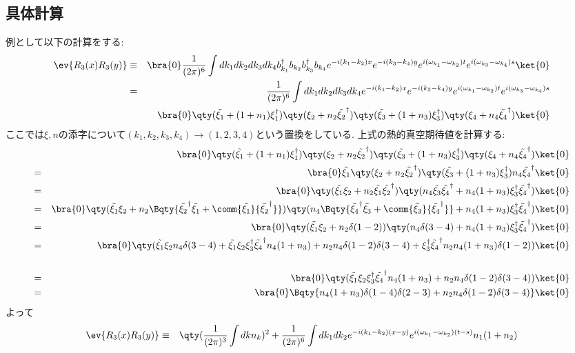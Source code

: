 \subsection{具体計算}
例として以下の計算をする:
\begin{eqnarray}
  \ev{R_3(x)R_3(y)} &\equiv& \bra{0}\frac{1}{(2\pi)^6}\int dk_1dk_2dk_3dk_4 b^\dagger_{k_1}b_{k_2}b^\dagger_{k_3}b_{k_4}e^{-i(k_1-k_2)x}e^{-i(k_3-k_4)y}e^{i(\omega_{k_1}-\omega_{k_2})t}e^{i(\omega_{k_3}-\omega_{k_4})s}\ket{0}\\
  \nonumber  &=& \frac{1}{(2\pi)^6}\int dk_1dk_2dk_3dk_4e^{-i(k_1-k_2)x}e^{-i(k_3-k_4)y}e^{i(\omega_{k_1}-\omega_{k_2})t}e^{i(\omega_{k_3}-\omega_{k_4})s}\\
  && \bra{0}\qty(\tilde{\xi_1} + (1+n_1)\xi_1^\dagger)\qty(\xi_2 + n_2\tilde{\xi_2}^\dagger)\qty(\tilde{\xi_3} + (1+n_3)\xi_3^\dagger)\qty(\xi_4 + n_4\tilde{\xi_4}^\dagger)\ket{0}
\end{eqnarray}
ここでは$\xi, n$の添字について$(k_1, k_2, k_3, k_4)\rightarrow(1, 2, 3, 4)$という置換をしている. 上式の熱的真空期待値を計算する:
\begin{eqnarray}
  &&\bra{0}\qty(\tilde{\xi_1} + (1+n_1)\xi_1^\dagger)\qty(\xi_2 + n_2\tilde{\xi_2}^\dagger)\qty(\tilde{\xi_3} + (1+n_3)\xi_3^\dagger)\qty(\xi_4 + n_4\tilde{\xi_4}^\dagger)\ket{0}\\
  =&&\bra{0}\tilde{\xi_1}\qty(\xi_2 + n_2\tilde{\xi_2}^\dagger)\qty(\tilde{\xi_3} + (1+n_3)\xi_3^\dagger)n_4\tilde{\xi_4}^\dagger\ket{0}\\
  =&&\bra{0}\qty(\tilde{\xi_1}\xi_2 + n_2\tilde{\xi_1}\tilde{\xi_2}^\dagger)\qty(n_4\tilde{\xi_3}\tilde{\xi_4}^\dagger + n_4(1+n_3)\xi_3^\dagger \tilde{\xi_4}^\dagger)\ket{0}\\
  =&&\bra{0}\qty(\tilde{\xi_1}\xi_2 + n_2\Bqty{\tilde{\xi_2}^\dagger\tilde{\xi_1} + \comm{\tilde{\xi_1}}{\tilde{\xi_2}^\dagger}})\qty(n_4\Bqty{\tilde{\xi_4}^\dagger\tilde{\xi_3} + \comm{\tilde{\xi_3}}{\tilde{\xi_4}^\dagger}} + n_4(1+n_3)\xi_3^\dagger \tilde{\xi_4}^\dagger)\ket{0}\\
  =&&\bra{0}\qty(\tilde{\xi_1}\xi_2 + n_2\delta(1-2))\qty(n_4\delta(3-4) + n_4(1+n_3)\xi_3^\dagger \tilde{\xi_4}^\dagger)\ket{0}\\
  \nonumber  = &&\bra{0}\qty(\tilde{\xi_1}\xi_2n_4\delta(3-4) + \tilde{\xi_1}\xi_2\xi_3^\dagger \tilde{\xi_4}^\dagger n_4(1+n_3) + n_2n_4\delta(1-2)\delta(3-4) + \xi_3^\dagger \tilde{\xi_4}^\dagger n_2n_4(1+n_3)\delta(1-2))\ket{0}\\
  \\
  = &&\bra{0}\qty(\tilde{\xi_1}\xi_2\xi_3^\dagger \tilde{\xi_4}^\dagger n_4(1+n_3) + n_2n_4\delta(1-2)\delta(3-4))\ket{0}\\
  = &&\bra{0}\Bqty{n_4(1+n_3)\delta(1-4)\delta(2-3) + n_2n_4\delta(1-2)\delta(3-4)}\ket{0}
\end{eqnarray}
よって
\begin{eqnarray}
  \nonumber  \ev{R_3(x)R_3(y)} &\equiv&\qty(\frac{1}{(2\pi)^3}\int dk n_k)^2 + \frac{1}{(2\pi)^6}\int dk_1dk_2 e^{-i(k_1-k_2)(x-y)}e^{i(\omega_{k_1}-\omega_{k_2})(t-s)}n_1(1+n_2)\label{expectation2}\\
\end{eqnarray}
